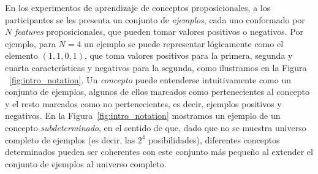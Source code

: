 En los experimentos de aprendizaje de conceptos proposicionales, a los participantes se les presenta un conjunto de \textit{ejemplos}, cada uno conformado por $N$ \textit{features} proposicionales, que pueden tomar valores positivos o negativos. Por ejemplo, para $N=4$ un ejemplo se puede representar lógicamente como el elemento $(1,1,0,1)$, que toma valores positivos para la primera, segunda y cuarta características y negativos para la segunda, como ilustramos en la Figura ~\ref{fig:intro_notation}. Un \textit{concepto} puede entenderse intuitivamente como un conjunto de ejemplos, algunos de ellos marcados como pertenecientes al concepto y el resto marcados como no pertenecientes, es decir, ejemplos positivos y negativos. En la Figura~\ref{fig:intro_notation} mostramos un ejemplo de un concepto \textit{subdeterminado}, en el sentido de que, dado que no se muestra universo completo de ejemplos (es decir, las $2^4$ posibilidades), diferentes conceptos determinados pueden ser coherentes con este conjunto más pequeño al extender el conjunto de ejemplos al universo completo.


